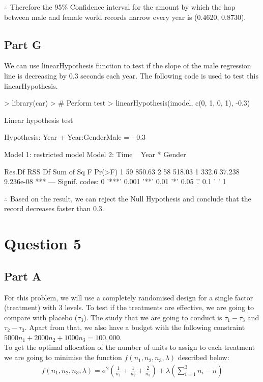 \documentclass{article}
\begin{document}
\noindent $\therefore$ Therefore the 95\% Confidence interval for the amount by which the hap between male and female world records narrow every year is (0.4620, 0.8730).

\subsection{Part G}
We can use linearHypothesis function to test if the slope of the male regression line is decreasing by 0.3 seconds each year. The following code is used to test this linearHypothesis.

\begin{Schunk}
\begin{Sinput}
> library(car)
> # Perform test
> linearHypothesis(imodel, c(0, 1, 0, 1), -0.3)
\end{Sinput}
\begin{Soutput}
Linear hypothesis test

Hypothesis:
Year  + Year:GenderMale = - 0.3

Model 1: restricted model
Model 2: Time ~ Year * Gender

  Res.Df    RSS Df Sum of Sq      F    Pr(>F)    
1     59 850.63                                  
2     58 518.03  1     332.6 37.238 9.236e-08 ***
---
Signif. codes:  0 '***' 0.001 '**' 0.01 '*' 0.05 '.' 0.1 ' ' 1
\end{Soutput}
\end{Schunk}

\noindent $\therefore$ Based on the result, we can reject the Null Hypothesis and conclude that the record decreases faster than 0.3.

\section{Question 5}
\subsection{Part A}
For this problem, we will use a completely randomised design for a single factor (treatment) with 3 levels. To test if the treatments are effective, we are going to compare with placebo ($\tau_3$). The study that we are going to conduct is $\tau_1 - \tau_3$ and $\tau_2 - \tau_3$. Apart from that, we also have a budget with the following constraint $5000n_1 + 2000n_2 + 1000n_3 = 100,000$. \\

\noindent To get the optimal allocation of the number of units to assign to each treatment we are going to minimise the function $f(n_1, n_2, n_3, \lambda)$ described below:
\begin{eqnarray*}
f(n_1, n_2, n_3, \lambda) = \sigma^2(\frac{1}{n_1} + \frac{1}{n_2} + \frac{2}{n_3}) + \lambda(\sum_{i=1}^3 n_i - n) 
\end{eqnarray*}
\end{document}
